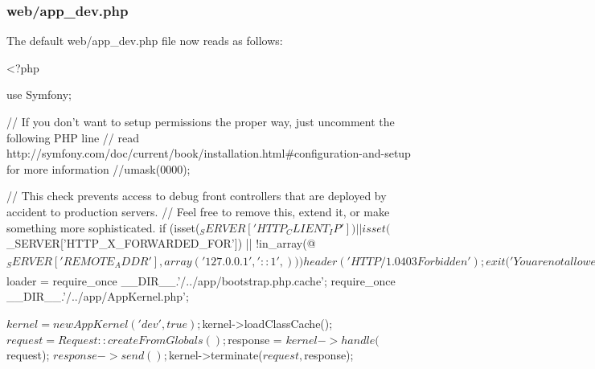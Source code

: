 \subsubsection*{{\ttfamily web/app\+\_\+dev.\+php}}

The default {\ttfamily web/app\+\_\+dev.\+php} file now reads as follows\+: \begin{DoxyVerb}<?php

use Symfony\Component\HttpFoundation\Request;

// If you don't want to setup permissions the proper way, just uncomment the following PHP line
// read http://symfony.com/doc/current/book/installation.html#configuration-and-setup for more information
//umask(0000);

// This check prevents access to debug front controllers that are deployed by accident to production servers.
// Feel free to remove this, extend it, or make something more sophisticated.
if (isset($_SERVER['HTTP_CLIENT_IP'])
    || isset($_SERVER['HTTP_X_FORWARDED_FOR'])
    || !in_array(@$_SERVER['REMOTE_ADDR'], array(
        '127.0.0.1',
        '::1',
    ))
) {
    header('HTTP/1.0 403 Forbidden');
    exit('You are not allowed to access this file. Check '.basename(__FILE__).' for more information.');
}

$loader = require_once __DIR__.'/../app/bootstrap.php.cache';
require_once __DIR__.'/../app/AppKernel.php';

$kernel = new AppKernel('dev', true);
$kernel->loadClassCache();
$request = Request::createFromGlobals();
$response = $kernel->handle($request);
$response->send();
$kernel->terminate($request, $response);\end{DoxyVerb}
 